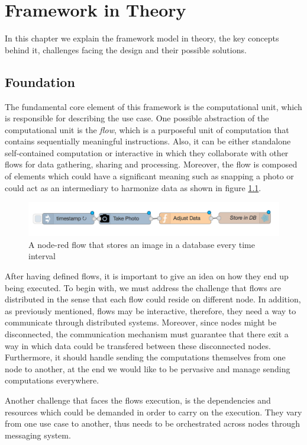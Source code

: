 
\chapter{Framework in Theory}\label{chapter:Foundation}
In this chapter we explain the framework model in theory, the key concepts behind it, challenges facing the design and their possible solutions.


\section{Foundation}
	The fundamental core element of this framework is the computational unit, which is responsible for describing the use case. One possible abstraction of the computational unit is the \textit{flow}, which is a purposeful unit of computation that contains sequentially meaningful instructions. Also, it can be either standalone self-contained computation or interactive in which they collaborate with other flows for data gathering, sharing and processing. Moreover, the flow is composed of elements which could have a significant meaning such as snapping a photo or could act as an intermediary to harmonize data as shown in figure \ref{fig:flow}. 
	
\begin{figure}[H]
	\centering
	\includegraphics[scale=0.5]{images/db-out.png} 
	\caption{A node-red flow that stores an image in a database every time interval}
	\label{fig:flow}
\end{figure}

After having defined flows, it is important to give an idea on how they end up being executed. To begin with, we must address the challenge that flows are distributed in the sense that each flow could reside on different node. In addition, as previously mentioned, flows may be interactive, therefore, they need a way to communicate through distributed systems. Moreover, since nodes might be disconnected,  the communication mechanism must guarantee that there  exit  a way  in which data could be transfered between these disconnected nodes. Furthermore, it  should handle sending the computations themselves from one node to another, at the end we would like to be pervasive and manage sending computations everywhere.

 Another challenge that faces the flows execution, is the dependencies and resources which could be demanded in order to carry on the execution. They vary from one use case to another, thus needs to be orchestrated across nodes through messaging system.

